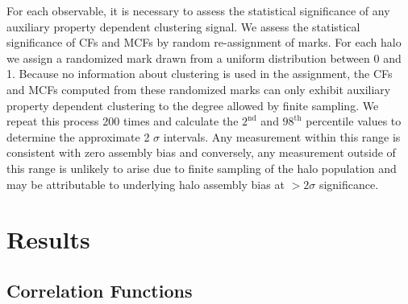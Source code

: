 \documentclass[usenatbib,fleqn]{mnras}
\begin{document}
For each observable, it is necessary to assess the statistical significance of any auxiliary property dependent clustering signal. We assess the statistical significance of CFs and MCFs by random re-assignment of marks. For each halo we assign a randomized mark drawn from a uniform distribution between 0 and 1. Because no information about clustering is used in the assignment, the CFs and MCFs computed from these randomized marks can only exhibit auxiliary property dependent clustering to the degree allowed by finite sampling. We repeat this process 200 times and calculate the $2^{\mathrm{nd}}$ and $98^{\mathrm{th}}$ percentile values to determine the approximate 2 $\sigma$ intervals. Any measurement within this range is consistent with zero assembly bias and conversely, any measurement outside of this range is unlikely to arise due to finite sampling of the halo population and may be attributable to underlying halo assembly bias at $> 2\sigma$ significance.


\section[]{Results}
\label{section:results}


\subsection{Correlation Functions}
\label{sub:cfresults}
\end{document}
